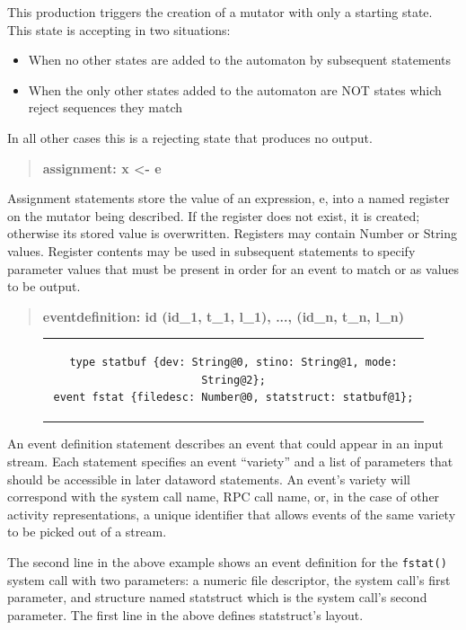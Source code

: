 This production triggers the creation of a mutator with only a starting
state.  This state is accepting in two situations:
\begin{itemize}
  \item{When no other states are added to the automaton by subsequent
    statements}
  \item{When the only other states added to the automaton are NOT states
    which reject sequences they match}
\end{itemize}
In all other cases this is a rejecting state that produces no output.

\begin{quote}
\centering
\textbf{assignment: x <- e}
\end{quote}

Assignment statements store the value of an expression, e, into a named
register on the mutator being described.
If the register does not exist,
it is created;
otherwise its stored value is overwritten.
Registers may contain Number or String values.  Register contents
may be used in subsequent statements to specify parameter values that must
be present in order for an event to match or as values to be output.

\begin{quote}
\centering
\textbf{eventdefinition: id (id\_1, t\_1, l\_1), ..., (id\_n, t\_n, l\_n) }
\end{quote}

\begin{figure}[H]
\centering
\begin{tabular}{c}
\begin{lstlisting}
type statbuf {dev: String@0, stino: String@1, mode: String@2};
event fstat {filedesc: Number@0, statstruct: statbuf@1};
\end{lstlisting}
\end{tabular}
\end{figure}

An event definition statement describes an event that could appear in an input
stream.  Each statement specifies an event ``variety'' and a list of
parameters that should be accessible in later dataword statements.
An event's variety will correspond
with the system call name, RPC call name, or, in the case of other activity
representations, a unique identifier that allows events of the same
variety to be picked out of a stream.

The second line in the above example shows an event
definition for
the {\tt fstat()} system call
with two parameters:
a numeric file descriptor, the system call's first parameter,
and structure named statstruct
which is the system call's second parameter.
The first line in the above defines statstruct's layout.


